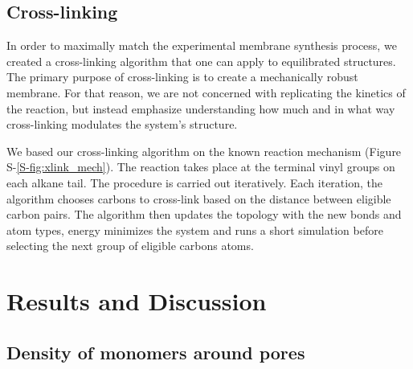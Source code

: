 \documentclass[journal=jpcbfk,manuscript=article]{achemso}
\begin{document}
  \subsection{Cross-linking}
  
  In order to maximally match the experimental membrane synthesis process,
  we created a cross-linking algorithm that one can apply to equilibrated structures. 
  The primary purpose of cross-linking is to create a mechanically robust membrane.
  For that reason, we are not concerned with replicating the kinetics of the reaction, 
  but instead emphasize understanding how much and in what way cross-linking modulates
  the system's structure.

  We based our cross-linking algorithm on the known reaction mechanism 
  (Figure S-\ref{S-fig:xlink_mech}). The reaction takes place at the terminal vinyl groups
  on each alkane tail. The procedure is carried out iteratively. Each iteration, the
  algorithm chooses carbons to cross-link based on the distance between eligible 
  carbon pairs. The algorithm then updates the topology with the new bonds and atom
  types, energy minimizes the system and runs a short simulation before selecting 
  the next group of eligible carbons atoms.

  \section{Results and Discussion}
  
  \subsection{Density of monomers around pores}\label{section:mon_per_pore}
\end{document}
